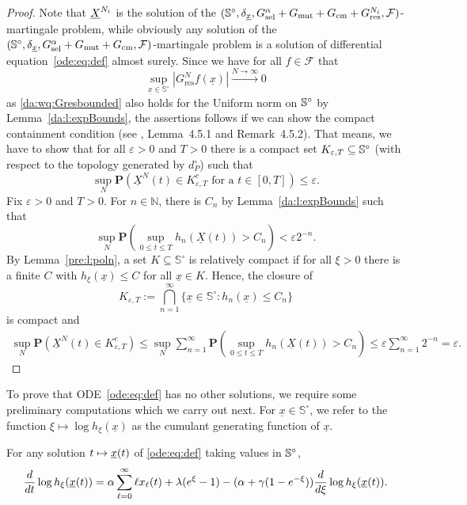\begin{proof}
Note that $\underline{X}^{N_i}$ is the solution of the 
$(\mathbb{S}^\circ, \delta_{\underline x}, G^{\alpha}_{\text{sel}} + G_{\text{mut}} + G_{\text{cm}} + G_{\text{res}}^{N_i},
\mathcal{F})$-martingale problem, while obviously any solution of the 
$(\mathbb{S}^\circ, \delta_{\underline x}, G^{\alpha}_{\text{sel}} + G_{\text{mut}} + G_{\text{cm}}, \mathcal{F})$-martingale
problem is a solution of differential equation~\eqref{ode:eq:def} almost surely. 
Since we have for all $f\in\mathcal F$ that
$$ \sup_{\underline x \in \mathbb S^\circ} 
|G_{\text{res}}^N f(\underline x)| \xrightarrow{N\to\infty} 0 $$
as \eqref{da:wq:Gresbounded} also holds for the Uniform norm on $\mathbb{S}^\circ$ by
Lemma~\ref{da:l:expBounds}, the assertions follows if we can show the compact containment condition (see 
\cite{ethier_markov_2005}, Lemma~4.5.1 and Remark~4.5.2). That means,
we have to show that for all $\varepsilon>0$ and $T>0$ there is a
compact set $K_{\varepsilon, T}\subseteq \mathbb{S}^\circ$ (with respect to the topology generated by
$d_P^\circ$) such that 
$$ \sup_{N} \mathbf P(\underline X^N(t) \in K^c_{\varepsilon, T} \text{ for a } t \in [0,T])\leq
\varepsilon.$$ Fix $\varepsilon>0$ and $T>0$. For $n\in\mathbb N$, there is $C_{n}$ by
Lemma~\ref{da:l:expBounds} such that
$$ \sup_{N} \mathbf P(\sup_{0\leq t\leq T} h_n(\underline X(t))>C_{n}) 
< \varepsilon 2^{-n}. $$ By Lemma~\ref{pre:l:poln}, a set $K \subseteq
\mathbb S^\circ$ is relatively compact if for all $\xi>0$ there is a
finite $C$ with $h_\xi(\underline x)\leq C$ for all $\underline x\in
K$. Hence, the closure of
$$ K_{\varepsilon, T} := \bigcap_{n=1}^\infty \{\underline x\in\mathbb S^\circ: h_n(\underline x) \leq C_{n}\}$$
is compact and
\begin{align*}
\sup_{N} \mathbf P(\underline X^N(t) \in K^c_{\varepsilon, T})\leq \sup_{N} 
\sum_{n=1}^\infty \mathbf P(\sup_{0\leq t\leq T} h_n(\underline X(t))>C_{n}) \leq
\varepsilon \sum_{n=1}^\infty 2^{-n} = \varepsilon.
\end{align*}  
\end{proof}

\noindent
To prove that ODE~\eqref{ode:eq:def} has no other solutions, we require some preliminary
computations which we carry out next. For $\underline x\in\mathbb S^\circ$, we refer to the function
$\xi\mapsto \log h_\xi(\underline x)$ as the cumulant generating function of $\underline x$.

\begin{Proposition}\label{ode:p:dyn_cum}
For any solution $t\mapsto  \underline{x} \! \left( t \right) $ of \eqref{ode:eq:def} taking values in $\mathbb{S}^\circ$, 
$$ \frac{d}{dt} \log h_\xi( \underline{x} \! \left( t \right) ) 
= \alpha \sum_{\ell =0}^\infty \ell x_\ell (t) + \lambda(e^\xi -1) - (\alpha +
  \gamma(1-e^{-\xi}))\frac{d}{d\xi} \log h_\xi( \underline{x} \! \left( t \right) ). $$
\end{Proposition}

